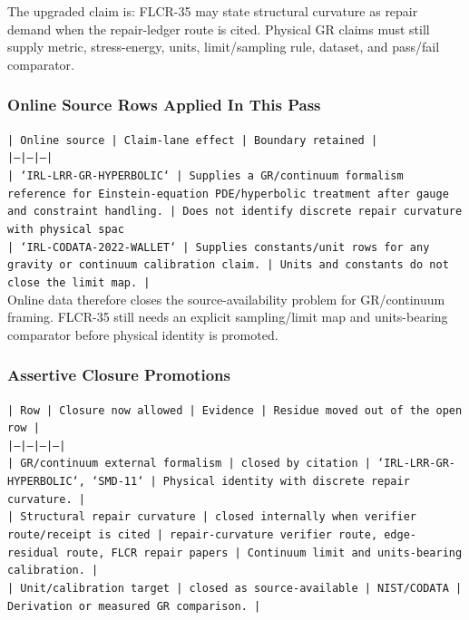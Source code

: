 \documentclass[11pt]{article}
\begin{document}
The upgraded claim is: FLCR-35 may state structural curvature as repair demand when the repair-ledger route is cited. Physical GR claims must still supply metric, stress-energy, units, limit/sampling rule, dataset, and pass/fail comparator.

\subsubsection*{Online Source Rows Applied In This Pass}

\noindent\texttt{| Online source | Claim-lane effect | Boundary retained |}\\
\noindent\texttt{|---|---|---|}\\
\noindent\texttt{| `IRL-LRR-GR-HYPERBOLIC` | Supplies a GR/continuum formalism reference for Einstein-equation PDE/hyperbolic treatment after gauge and constraint handling. | Does not identify discrete repair curvature with physical spac}\\
\noindent\texttt{| `IRL-CODATA-2022-WALLET` | Supplies constants/unit rows for any gravity or continuum calibration claim. | Units and constants do not close the limit map. |}\\

Online data therefore closes the source-availability problem for GR/continuum framing. FLCR-35 still needs an explicit sampling/limit map and units-bearing comparator before physical identity is promoted.

\subsubsection*{Assertive Closure Promotions}

\noindent\texttt{| Row | Closure now allowed | Evidence | Residue moved out of the open row |}\\
\noindent\texttt{|---|---|---|---|}\\
\noindent\texttt{| GR/continuum external formalism | closed by citation | `IRL-LRR-GR-HYPERBOLIC`, `SMD-11` | Physical identity with discrete repair curvature. |}\\
\noindent\texttt{| Structural repair curvature | closed internally when verifier route/receipt is cited | repair-curvature verifier route, edge-residual route, FLCR repair papers | Continuum limit and units-bearing calibration. |}\\
\noindent\texttt{| Unit/calibration target | closed as source-available | NIST/CODATA | Derivation or measured GR comparison. |}\\
\end{document}
